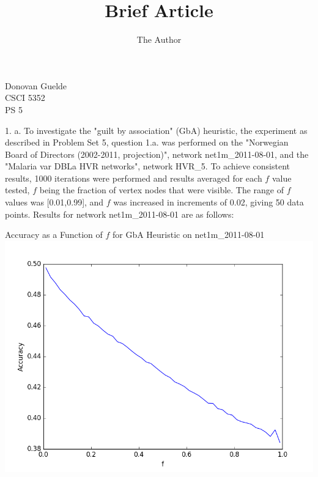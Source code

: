 \documentclass[11pt, oneside]{article}   	%
\title{Brief Article}
\author{The Author}
\begin{document}
\begin{flushright}
Donovan Guelde\\
CSCI 5352\\
PS 5\\
\end{flushright}
1. a.  To investigate the "guilt by association" (GbA) heuristic, the experiment as described in Problem Set 5, question 1.a. was performed on the "Norwegian Board of Directors (2002-2011, projection)", network net1m\_2011-08-01, and the "Malaria var DBLa HVR networks", network HVR\_5.  To achieve consistent results, 1000 iterations were performed and results averaged for each $f$ value tested, $f$ being the fraction of vertex nodes that were visible.  The range of $f$ values was [0.01,0.99], and $f$ was increased in increments of 0.02, giving 50 data points.  Results for network net1m\_2011-08-01 are as follows:\\
\begin{center} Accuracy as a Function of $f$ for GbA Heuristic on net1m\_2011-08-01 \includegraphics[scale=0.6]{net1m_2011-08-011000Iterations.png}\end{center}
\
\end{document}

